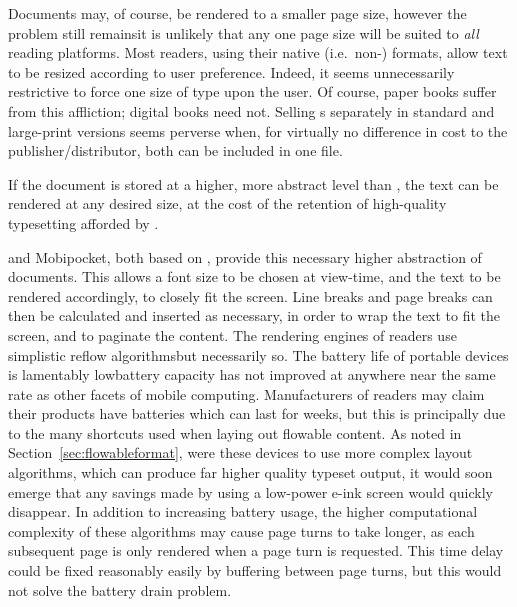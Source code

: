 Documents may, of course, be rendered to a smaller page size, however the problem still remains\ed it is unlikely that any one page size will be suited to \emph{all} reading platforms. Most \ebook{} readers, using their native (i.e.\ non-\pdf{}) formats, allow text to be resized according to user preference. Indeed, it seems unnecessarily restrictive to force one size of type upon the user. Of course, paper books suffer from this affliction; digital books need not. Selling \ebook{}s separately in standard and large-print versions seems perverse when, for virtually no difference in cost to the publisher/distributor, both can be included in one file.

If the document is stored at a higher, more abstract level than \pdf{}, the text can be rendered at any desired size, at the cost of the retention of high-quality typesetting afforded by \pdf{}.


\epub{} and Mobipocket, both based on \html{}, provide this necessary higher abstraction of documents. This allows a font size to be chosen at view-time, and the text to be rendered accordingly, to closely fit the screen. Line breaks and page breaks can then be calculated and inserted as necessary, in order to wrap the text to fit the screen, and to paginate the content. The rendering engines of \ebook{} readers use simplistic reflow algorithms\ed but necessarily so. The battery life of portable devices is lamentably low\ed battery capacity has not improved at anywhere near the same rate as other facets of mobile computing. Manufacturers of \ebook{} readers may claim their products have batteries which can last for weeks, but this is principally due to the many shortcuts used when laying out flowable content. As noted in Section~\ref{sec:flowableformat}, were these devices to use more complex layout algorithms, which can produce far higher quality typeset output, it would soon emerge that any savings made by using a low-power e-ink screen would quickly disappear. In addition to increasing battery usage, the higher computational complexity of these algorithms may cause page turns to take longer, as each subsequent page is only rendered when a page turn is requested. This time delay could be fixed reasonably easily by buffering between page turns, but this would not solve the battery drain problem.


